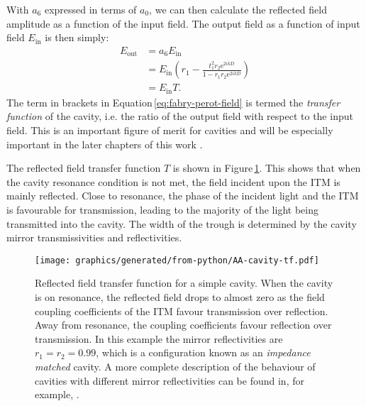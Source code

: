 With $a_6$ expressed in terms of $a_0$, we can then calculate the reflected field amplitude as a function of the input field. The output field as a function of input field $E_{\text{in}}$ is then simply:
\begin{equation}
  \label{eq:fabry-perot-field}
  \begin{split}
    E_{\text{out}} &= a_6 E_{\text{in}} \\
                   &= E_{\text{in}} \left( r_1 - \frac{t_1^2 r_2 \text{e}^{2ikD}}{1 - r_1 r_2 \text{e}^{2ikD}} \right) \\
                   &= E_{\text{in}} T.
  \end{split}
\end{equation}
The term in brackets in Equation\,\ref{eq:fabry-perot-field} is termed the \emph{transfer function} of the cavity, i.e. the ratio of the output field with respect to the input field. This is an important figure of merit for cavities and will be especially important in the later chapters of this work .

The reflected field transfer function $T$ is shown in Figure\,\ref{fig:cavity-tf}. This shows that when the cavity resonance condition is not met, the field incident upon the \gls{ITM} is mainly reflected. Close to resonance, the phase of the incident light and the \gls{ITM} is favourable for transmission, leading to the majority of the light being transmitted into the cavity. The width of the trough is determined by the cavity mirror transmissivities and reflectivities. 

\begin{figure}
  \centering
  \texttt{[image: graphics/generated/from-python/AA-cavity-tf.pdf]}
  \caption[Reflected field transfer function for a simple \FP{} cavity]{\label{fig:cavity-tf}Reflected field transfer function for a simple \FP{} cavity. When the cavity is on resonance, the reflected field drops to almost zero as the field coupling coefficients of the ITM favour transmission over reflection. Away from resonance, the coupling coefficients favour reflection over transmission. In this example the mirror reflectivities are $r_1 = r_2 = 0.99$, which is a configuration known as an \emph{impedance matched} cavity. A more complete description of the behaviour of cavities with different mirror reflectivities can be found in, for example, \cite{Freise2010}.}
\end{figure}

